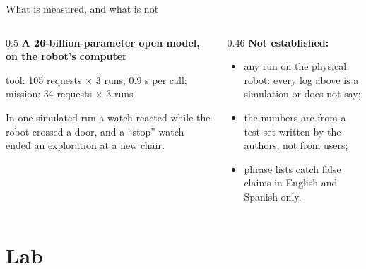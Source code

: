 \documentclass[10pt, aspectratio=169]{beamer}
\begin{document}
\begin{frame}{What is measured, and what is not}
  \begin{columns}[T]
    \begin{column}{0.5\textwidth}
      \centering\small\textbf{A 26-billion-parameter open model, on the robot's computer}\par\vspace{0.4em}
      \par\vspace{0.2em}
      {\scriptsize tool: 105 requests $\times$ 3 runs, 0.9 s per call; mission: 34 requests $\times$ 3 runs\par}
      \small
      In one simulated run a watch reacted while the robot crossed a door, and a ``stop'' watch ended
      an exploration at a new chair.
    \end{column}
    \begin{column}{0.46\textwidth}
      \small
      \textbf{Not established:}
      \begin{itemize}
        \item any run on the physical robot: every log above is a simulation or does not say;
        \item the numbers are from a test set written by the authors, not from users;
        \item phrase lists catch false claims in English and Spanish only.
      \end{itemize}
    \end{column}
  \end{columns}
\end{frame}

\section{Lab}
\end{document}
